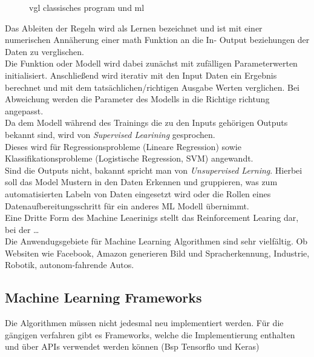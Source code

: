 \begin{figure}[htb]
    \centering
    \begin{minipage}[b]{0.4\textwidth}
        \centering
        
    \end{minipage}
    \begin{minipage}[b]{0.4\textwidth}
        \centering
        
    \end{minipage}
    \caption{vgl classisches program und ml}
    \label{fig:ml_system}
\end{figure}

Das Ableiten der Regeln wird als Lernen bezeichnet und ist 
mit einer numerischen Annäherung einer math Funktion an die In- Output 
beziehungen der Daten zu verglischen.
\\
Die Funktion oder Modell wird dabei zunächst mit zufälligen 
Parameterwerten initialisiert. Anschließend wird iterativ mit den 
Input Daten ein Ergebnis berechnet und mit dem tatsächlichen/richtigen 
Ausgabe Werten verglichen. Bei Abweichung werden die Parameter des 
Modells in die Richtige richtung angepasst.
\\
Da dem Modell während des Trainings die zu den Inputs gehörigen 
Outputs bekannt sind, wird von \textit{Supervised Learining} 
gesprochen.
\\
Dieses wird für Regressionsprobleme (Lineare Regression) sowie 
Klassifikationsprobleme (Logistische Regression, SVM) angewandt.
\\
Sind die Outputs nicht, bakannt spricht man von \textit{Unsupervised 
Lerning}. Hierbei soll das Model Mustern in den Daten Erkennen und 
gruppieren, was zum automatisierten Labeln von Daten eingesetzt 
wird oder die Rollen eines Datenaufbereitungsschritt für ein 
anderes ML Modell übernimmt.
\\
Eine Dritte Form des Machine Leaerinigs stellt das Reinforcement Learing 
dar, bei der \dots
\\
Die Anwendugsgebiete für Machine Learning Algorithmen sind 
sehr vielfältig. Ob Websiten wie Facebook, Amazon generieren 
Bild und Spracherkennung, Industrie, Robotik, autonom-fahrende Autos.

\subsection{Machine Learning Frameworks}

Die Algorithmen müssen nicht jedesmal neu implementiert werden. 
Für die gängigen verfahren gibt es Frameworks, welche 
die Implementierung enthalten und über APIs verwendet 
werden können (Bsp Tensorflo und Keras)




